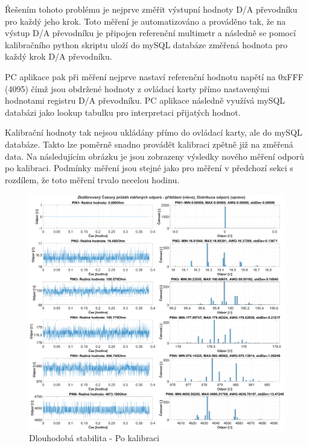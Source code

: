 Řešením tohoto problému je nejprve změřit výstupní hodnoty D/A převodníku pro každý jeho krok.
Toto měření je automatizováno a prováděno tak, že na výstup D/A převodníku je připojen referenční multimetr
a následně se pomocí kalibračního python skriptu uloží do mySQL databáze změřená hodnota pro každý krok D/A převodníku.\par

PC aplikace pak při měření nejprve nastaví referenční hodnotu napětí
na 0xFFF (4095) čímž jsou obdržené hodnoty z ovládací karty
přímo nastavenými hodnotami registru D/A převodníku. PC aplikace následně využívá mySQL databázi jako lookup tabulku pro 
interpretaci přijatých hodnot. \par

Kalibrační hodnoty tak nejsou ukládány přímo do ovládací karty, ale do mySQL databáze. Takto lze poměrně snadno provádět kalibraci zpětně
již na změřená data. Na následujícím obrázku je jsou zobrazeny výsledky nového měření odporů po kalibraci.
Podmínky měření jsou stejné jako pro měření v předchozí sekci s rozdílem, že toto měření trvalo necelou hodinu.

\begin{figure}[ht!]
    \centering
    \includegraphics[width = 1\textwidth]{obrazky/matlab_generated/VOLTAGE_TESTER/calib_resistor_part1.eps}
    \caption{Dlouhodobá stabilita - Po kalibraci}
    \label{fig: 10hourTest calib Resistor PINS1TO6}
\end{figure}


